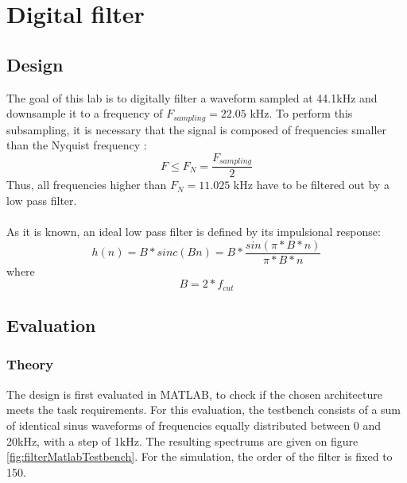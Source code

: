 \chapter{Digital filter}

\section{Design}

The goal of this lab is to digitally filter a waveform sampled at 44.1kHz and downsample it to a frequency of $F_{sampling}=22.05$ kHz. To perform this subsampling, it is necessary that the signal is composed of frequencies smaller than the Nyquist frequency : 
\[ F \le F_N = \frac{F_{sampling}}{2} \] 
Thus, all frequencies higher than $ F_N = 11.025$ kHz have to be filtered out by a low pass filter.\\
\\
As it is known, an ideal low pass filter is defined by its impulsional response: 
\[ h(n) = B*sinc(Bn) = B * \frac{sin(\pi*B*n)}{\pi*B*n} \] where \[B = 2*f_{cut}\]

\section{Evaluation}

\subsection{Theory}

The design is first evaluated in MATLAB, to check if the chosen architecture meets the task requirements. For this evaluation, the testbench consists of a sum of identical sinus waveforms of frequencies equally distributed between 0 and 20kHz, with a step of 1kHz. The resulting spectrums are given on figure \ref{fig:filterMatlabTestbench}. For the simulation, the order of the filter is fixed to 150.

